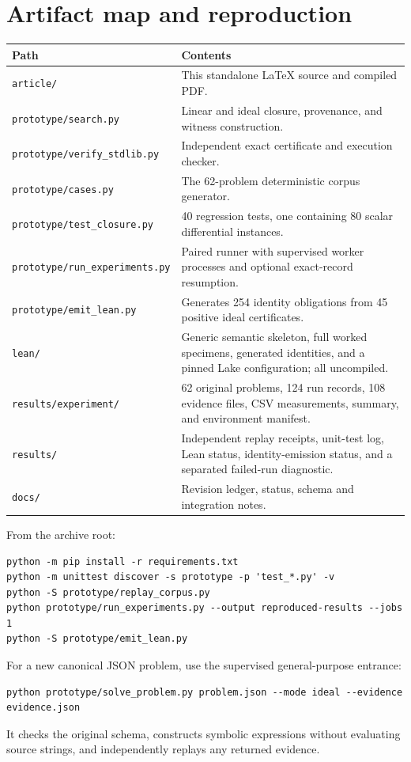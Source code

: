 \documentclass[11pt,letterpaper]{article}
\theoremstyle{definition}
\newcommand{\code}[1]{\nolinkurl{#1}}
\begin{document}
\appendix
\section{Artifact map and reproduction}

\begin{tabularx}{\linewidth}{@{}p{.32\linewidth}Y@{}}
\toprule
Path & Contents\\
\midrule
\code{article/} & This standalone LaTeX source and compiled PDF.\\
\code{prototype/search.py} & Linear and ideal closure, provenance, and witness
construction.\\
\code{prototype/verify_stdlib.py} & Independent exact certificate and execution
checker.\\
\code{prototype/cases.py} & The 62-problem deterministic corpus generator.\\
\code{prototype/test_closure.py} & 40 regression tests, one containing 80 scalar
differential instances.\\
\code{prototype/run_experiments.py} & Paired runner with supervised worker
processes and optional exact-record resumption.\\
\code{prototype/emit_lean.py} & Generates 254 identity obligations from 45 positive
ideal certificates.\\
\code{lean/} & Generic semantic skeleton, full worked specimens, generated
identities, and a pinned Lake configuration; all uncompiled.\\
\code{results/experiment/} & 62 original problems, 124 run records, 108 evidence
files, CSV measurements, summary, and environment manifest.\\
\code{results/} & Independent replay receipts, unit-test log, Lean status,
identity-emission status, and a separated failed-run diagnostic.\\
\code{docs/} & Revision ledger, status, schema and integration notes.\\
\bottomrule
\end{tabularx}

From the archive root:
\begin{lstlisting}
python -m pip install -r requirements.txt
python -m unittest discover -s prototype -p 'test_*.py' -v
python -S prototype/replay_corpus.py
python prototype/run_experiments.py --output reproduced-results --jobs 1
python -S prototype/emit_lean.py
\end{lstlisting}
For a new canonical JSON problem, use the supervised general-purpose entrance:
\begin{lstlisting}
python prototype/solve_problem.py problem.json --mode ideal --evidence evidence.json
\end{lstlisting}
It checks the original schema, constructs symbolic expressions without evaluating
source strings, and independently replays any returned evidence.
\end{document}
